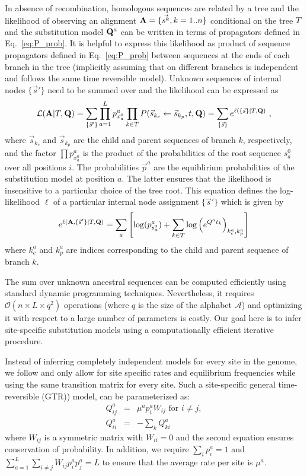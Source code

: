 \documentclass[aps,rmp,twocolumn]{revtex4}
\newcommand{\mat}[1]{{\bf #1}}
\newcommand{\abet}{\mathcal{A}}
\newcommand{\eqp}{p}
\newcommand{\LH}{\mathcal{L}}
\newcommand{\lh}{\ell}
\begin{document}
In absence of recombination, homologous sequences are related by a tree and the likelihood of observing an alignment $\mat{A}=\{\vec{s^k}, k=1..n\}$ conditional on the tree $T$ and the substitution model $\mat{Q}^{a}$ can be written in terms of propagators defined in Eq.~\ref{eq:P_prob}.
It is helpful to express this likelihood as product of sequence propagators defined in Eq.~\ref{eq:P_prob} between sequences at the ends of each branch in the tree (implicitly assuming that on different branches is independent and follows the same time reversible model).
Unknown sequences of internal nodes $\{\vec{s}'\}$ need to be summed over and the likelihood can be expressed as
\begin{equation}
	\LH(\mat{A}|T,\mat{Q}) = \sum_{\{\vec{s}'\}}\prod_{a=1}^L \eqp^{a}_{x^{0}_a} \prod_{k\in T}P(\vec{s}_{k_c}\leftarrow \vec{s}_{k_p},t,\mat{Q}) = \sum_{\{\vec{s}\}} e^{\lh(\{\vec{s}\} |T, \mat{Q})}  \ ,
	\label{eq:LH}
\end{equation}
where $\vec{s}_{k_c}$ and $\vec{s}_{k_p}$ are the child and parent sequences of branch $k$, respectively, and the factor $\prod \eqp^{a}_{x^{0}_a}$ is the product of the probabilities of the root sequence $s^{0}_a$ over all positions $i$.
The probabilities $\vec{\eqp}^{a}$ are the equiblirium probabilities of the substitution model at position $a$.
The latter ensures that the likelihood is insensitive to a particular choice of the tree root.
This equation defines the log-likelihood $\lh$ of a particular internal node assignment $\{\vec{s}'\}$ which is given by
\begin{equation}
	e^{\lh(\mat{A}, \{\vec{s}'\} |T, \mat{Q})} = \sum_a \left[\log(\eqp^a_{s^{0}_a}) + \sum_{k\in T} \log\left( e^{Q^at_k} \right)_{k^a_c, k^a_p}\right]
\end{equation}
where $k^a_c$ and $k^a_p$ are indices corresponding to the child and parent sequence of branch $k$.

The sum over unknown ancestral sequences can be computed efficiently using standard dynamic programming techniques.
Nevertheless, it requires $\mathcal{O}(n\times L \times q^2)$ operations (where $q$ is the size of the alphabet $\abet$) and optimizing it with respect to a large number of parameters is costly.
Our goal here is to infer site-specific substitution models using a computationally efficient iterative procedure.

Instead of inferring completely independent models for every site in the genome, we follow \citet{halpern_evolutionary_1998} and only allow for site specific rates and equilibrium frequencies while using the same transition matrix for every site.
Such a site-specific general time-reversible (GTR)) model, can be parameterized as:
\begin{eqnarray}
Q^{a}_{ij} &=& \mu^{a}\eqp^{a}_{i} W_{ij} \textrm{ for } i\neq j,\nonumber \\
Q^{a}_{ii} &=& -\sum_k Q^{a}_{ki}
\label{eq:Qij_supp}
\end{eqnarray}
where $W_{ij}$ is a symmetric matrix with $W_{ii}=0$ and the second equation ensures conservation of probability.
In addition, we require $\sum_i \eqp^{a}_i = 1$ and $\sum_{a=1}^L\sum_{i\neq j}W_{ij}p^{a}_ip^{a}_j=L$ to ensure that the average rate per site is $\mu^{a}$.
\end{document}
